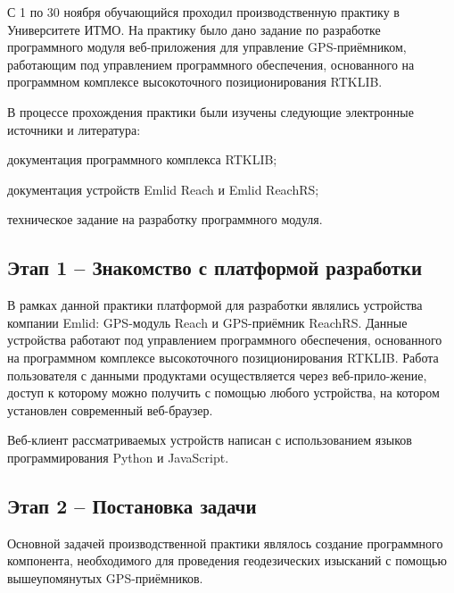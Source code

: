 \documentclass[ltitles]{../../scs-iam}
\begin{document}
  \pagestyle{headcenter}
  
  

  \setcounter{page}{1}
  
  
  С 1 по 30 ноября обучающийся проходил производственную практику в Университете ИТМО. На практику было дано задание по разработке программного модуля веб-приложения для управление GPS-приёмником, работающим под управлением программного обеспечения, основанного на программном комплексе высокоточного позиционирования RTKLIB. \par
  
  В процессе прохождения практики были изучены следующие электронные источники и литература:
  \begin{dashitemize}
    \item документация программного комплекса RTKLIB;
    \item документация устройств Emlid Reach и Emlid ReachRS;
    \item техническое задание на разработку программного модуля.
  \end{dashitemize}

  
  \subsection{Этап 1 -- Знакомство с платформой разработки}
  
  В рамках данной практики платформой для разработки являлись устройства компании Emlid: GPS-модуль Reach и GPS-приёмник ReachRS. Данные устройства работают под управлением программного обеспечения, основанного на программном комплексе высокоточного позиционирования RTKLIB. Работа пользователя с данными продуктами осуществляется через веб-прило-жение, доступ к которому можно получить с помощью любого устройства, на котором установлен современный веб-браузер. \par
  
  Веб-клиент рассматриваемых устройств написан с использованием языков программирования Python и JavaScript.
  
  \subsection{Этап 2 -- Постановка задачи}
  
  Основной задачей производственной практики являлось создание программного компонента, необходимого для проведения геодезических изысканий с помощью вышеупомянутых GPS-приёмников. \par
  
\end{document}
